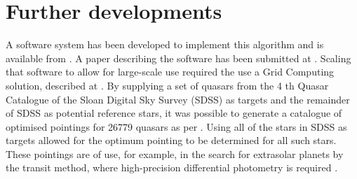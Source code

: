 \documentclass{aa}
\begin{document}
\section{Further developments}
A software system has been developed to implement this algorithm and is available from \citet{githubrepo}. A paper describing the software has been submitted at \citet{softwarepaper}. Scaling that software to allow for large-scale use required the use a Grid Computing solution, described at \citet{gridsystempaper}. By supplying a set of quasars from the 4 th Quasar Catalogue of the Sloan Digital Sky Survey (SDSS) as targets and the remainder of SDSS as potential reference stars, it was possible to generate a catalogue of optimised pointings for 26779 quasars as per \citet{quasarpaper,ZenodoQuasarCatalogue}. Using all of the stars in SDSS as targets allowed for the optimum pointing to be determined for all such stars. These pointings are of use, for example, in the search for extrasolar planets by the transit method, where high-precision differential photometry is required \citep{exopaper,ZenodoXOPCatalogue}.
\end{document}

